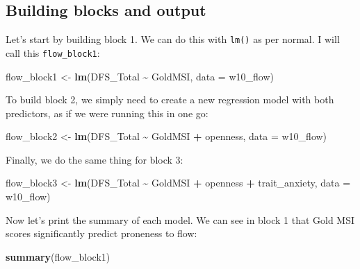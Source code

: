 \documentclass[
]{book}
\newenvironment{Shaded}{\begin{snugshade}}{\end{snugshade}}
\newcommand{\AttributeTok}[1]{\textcolor[rgb]{0.13,0.29,0.53}{#1}}
\newcommand{\FunctionTok}[1]{\textcolor[rgb]{0.13,0.29,0.53}{\textbf{#1}}}
\newcommand{\NormalTok}[1]{#1}
\newcommand{\OtherTok}[1]{\textcolor[rgb]{0.56,0.35,0.01}{#1}}
\newcommand{\SpecialCharTok}[1]{\textcolor[rgb]{0.81,0.36,0.00}{\textbf{#1}}}
\begin{document}
\subsection{Building blocks and output}\label{building-blocks-and-output}

Let's start by building block 1. We can do this with \texttt{lm()} as per normal. I will call this \texttt{flow\_block1}:

\begin{Shaded}
\begin{Highlighting}[]
\NormalTok{flow\_block1 }\OtherTok{\textless{}{-}} \FunctionTok{lm}\NormalTok{(DFS\_Total }\SpecialCharTok{\textasciitilde{}}\NormalTok{ GoldMSI, }\AttributeTok{data =}\NormalTok{ w10\_flow)}
\end{Highlighting}
\end{Shaded}

To build block 2, we simply need to create a new regression model with both predictors, as if we were running this in one go:

\begin{Shaded}
\begin{Highlighting}[]
\NormalTok{flow\_block2 }\OtherTok{\textless{}{-}} \FunctionTok{lm}\NormalTok{(DFS\_Total }\SpecialCharTok{\textasciitilde{}}\NormalTok{ GoldMSI }\SpecialCharTok{+}\NormalTok{ openness, }\AttributeTok{data =}\NormalTok{ w10\_flow)}
\end{Highlighting}
\end{Shaded}

Finally, we do the same thing for block 3:

\begin{Shaded}
\begin{Highlighting}[]
\NormalTok{flow\_block3 }\OtherTok{\textless{}{-}} \FunctionTok{lm}\NormalTok{(DFS\_Total }\SpecialCharTok{\textasciitilde{}}\NormalTok{ GoldMSI }\SpecialCharTok{+}\NormalTok{ openness }\SpecialCharTok{+}\NormalTok{ trait\_anxiety, }\AttributeTok{data =}\NormalTok{ w10\_flow)}
\end{Highlighting}
\end{Shaded}

Now let's print the summary of each model. We can see in block 1 that Gold MSI scores significantly predict proneness to flow:

\begin{Shaded}
\begin{Highlighting}[]
\FunctionTok{summary}\NormalTok{(flow\_block1)}
\end{Highlighting}
\end{Shaded}
\end{document}

